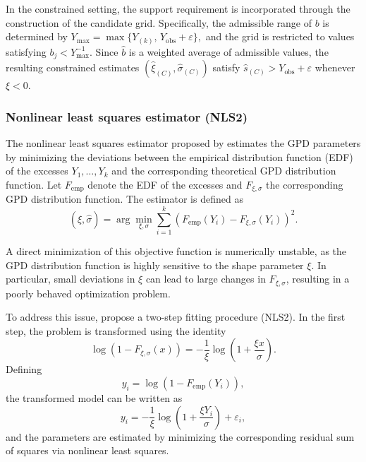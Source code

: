 In the constrained setting, the support requirement is incorporated through the construction of the candidate grid. Specifically, the admissible range of $b$ is determined by
$Y_{\max} = \max\{Y_{(k)},\, Y_{\mathrm{obs}}+\varepsilon\},$
and the grid is restricted to values satisfying $b_j < Y_{\max}^{-1}$. Since $\hat{b}$ is a weighted average of admissible values, the resulting constrained estimates $(\hat{\xi}_{(C)}, \hat{\sigma}_{(C)})$ satisfy $\hat{s}_{(C)} > Y_{\mathrm{obs}}+\varepsilon$ whenever $\xi < 0$.

\subsubsection*{Nonlinear least squares estimator (NLS2)}

The nonlinear least squares estimator proposed by \citet{song2012quantile} estimates the GPD parameters by minimizing the deviations between the empirical distribution function (EDF) of the excesses $Y_1,\dots,Y_k$ and the corresponding theoretical GPD distribution function. Let $F_{\mathrm{emp}}$ denote the EDF of the excesses and $F_{\xi,\sigma}$ the corresponding GPD distribution function. The estimator is defined as
\begin{equation}
(\hat{\xi}, \hat{\sigma}) = \arg\min_{\xi,\sigma} \sum_{i=1}^k \left(F_{\mathrm{emp}}(Y_i) - F_{\xi,\sigma}(Y_i)\right)^2.
\end{equation}

A direct minimization of this objective function is numerically unstable, as the GPD distribution function is highly sensitive to the shape parameter $\xi$. In particular, small deviations in $\xi$ can lead to large changes in $F_{\xi,\sigma}$, resulting in a poorly behaved optimization problem.

To address this issue, \citet{song2012quantile} propose a two-step fitting procedure (NLS2). In the first step, the problem is transformed using the identity
\begin{equation}
\log\left(1 - F_{\xi,\sigma}(x)\right) = -\frac{1}{\xi} \log\left(1 + \frac{\xi x}{\sigma}\right).
\end{equation}
Defining
\begin{equation}
y_i = \log\left(1 - F_{\mathrm{emp}}(Y_i)\right),
\end{equation}
the transformed model can be written as
\begin{equation}
y_i = -\frac{1}{\xi} \log\left(1 + \frac{\xi Y_i}{\sigma}\right) + \varepsilon_i,
\end{equation}
and the parameters are estimated by minimizing the corresponding residual sum of squares via nonlinear least squares.

